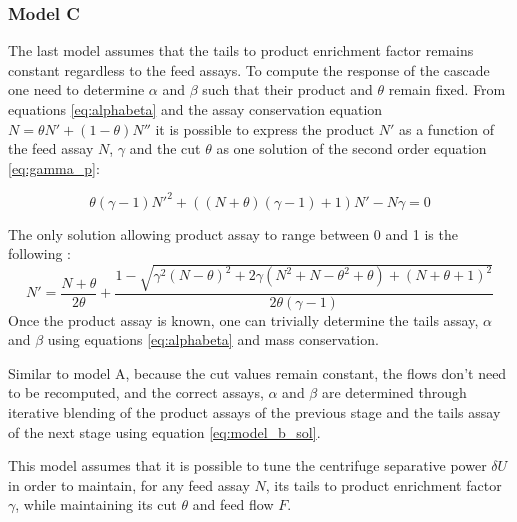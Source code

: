 \subsubsection{Model C}
The last model assumes that the tails to product enrichment factor remains
constant regardless to the feed assays. To compute the response of the cascade
one need to determine $\alpha$ and $\beta$ such that their product and
$\theta$ remain fixed. 
From equations \eqref{eq:alphabeta} and the assay conservation equation $N =
\theta N' + (1-\theta)N''$ it is possible to express the product $N'$ as a function of
the feed assay $N$, $\gamma$ and the cut $\theta$ as one solution of the second
order equation \eqref{eq:gamma_p}:

\begin{equation}\label{eq:gamma_p}
    \theta(\gamma-1)N'^2+((N+\theta)(\gamma-1)+1)N'-N\gamma = 0
\end{equation}


The only solution allowing product assay to range between 0 and 1 is the
following :
\begin{equation}\label{eq:model_b_sol}
    N' = \frac{N+\theta}{2\theta} +
         \frac{1 - \sqrt{\gamma^{2}(N-\theta)^{2}
                         + 2\gamma( N^{2} + N - \theta^{2} + \theta)
                         + (N + \theta + 1)^{2}}}
              {2\theta(\gamma - 1)}
\end{equation}
Once the product assay is known, one can trivially determine the tails assay,
$\alpha$ and $\beta$ using equations \eqref{eq:alphabeta} and mass
conservation.

Similar to model A, because the cut values remain constant, the flows don't
need to be recomputed, and the correct assays, $\alpha$ and $\beta$ are
determined through iterative blending of the product assays of the previous
stage and the tails assay of the next stage using equation
\eqref{eq:model_b_sol}.

This model assumes that it is possible to tune the centrifuge separative power
$\delta U$ in order to maintain, for any feed assay $N$, its tails to product
enrichment factor $\gamma$, while maintaining its cut $\theta$ and feed flow
$F$.

